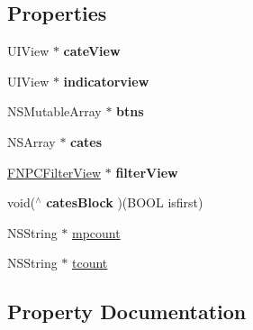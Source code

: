 \subsection*{Properties}
\begin{DoxyCompactItemize}
\item 
\mbox{\label{interface_f_n_promotional_filter_af005b96820316b986133e06bdc6de163}} 
U\+I\+View $\ast$ {\bfseries cate\+View}
\item 
\mbox{\label{interface_f_n_promotional_filter_a1d55d4c21115d1e38a73a1f7542fe34a}} 
U\+I\+View $\ast$ {\bfseries indicatorview}
\item 
\mbox{\label{interface_f_n_promotional_filter_aa57f57d384b357dc322179dd9633676e}} 
N\+S\+Mutable\+Array $\ast$ {\bfseries btns}
\item 
\mbox{\label{interface_f_n_promotional_filter_a2299b7c27b1d16f9a3b3038d13144c74}} 
N\+S\+Array $\ast$ {\bfseries cates}
\item 
\mbox{\label{interface_f_n_promotional_filter_ad3404c18fbc9c521fc2b75b9d97c7662}} 
\mbox{\hyperlink{interface_f_n_p_c_filter_view}{F\+N\+P\+C\+Filter\+View}} $\ast$ {\bfseries filter\+View}
\item 
\mbox{\label{interface_f_n_promotional_filter_ae4836bc6eb162923de60364644c692e8}} 
void($^\wedge$ {\bfseries cates\+Block} )(B\+O\+OL isfirst)
\item 
N\+S\+String $\ast$ \mbox{\hyperlink{interface_f_n_promotional_filter_aa0e5208fadef674f7b10708685689fdd}{mpcount}}
\item 
N\+S\+String $\ast$ \mbox{\hyperlink{interface_f_n_promotional_filter_a1c5d42bef60ca79c00301b5a0229563b}{tcount}}
\end{DoxyCompactItemize}


\subsection{Property Documentation}
\mbox{\label{interface_f_n_promotional_filter_aa0e5208fadef674f7b10708685689fdd}} 
